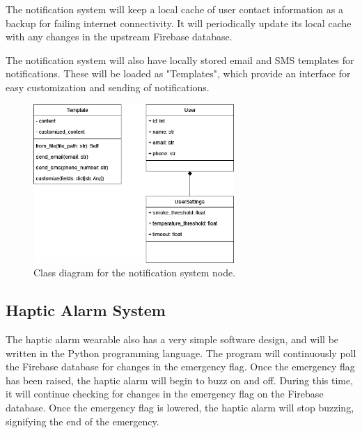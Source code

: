 The notification system will keep a local cache of user contact information as a backup for failing internet
connectivity. It will periodically update its local cache with any changes in the upstream Firebase database.

The notification system will also have locally stored email and SMS templates for notifications. These will be loaded
as "Templates", which provide an interface for easy customization and sending of notifications.

\begin{figure}[H]
    \centering
    \includegraphics[width=3in]{../assets/class/NotificationSystemClassDiagram.png}
    \caption{Class diagram for the notification system node.}
\end{figure}

\subsection{Haptic Alarm System}

The haptic alarm wearable also has a very simple software design, and will be written in the Python programming
language. The program will continuously poll the Firebase database for changes in the emergency flag. Once the
emergency flag has been raised, the haptic alarm will begin to buzz on and off. During this time, it will continue
checking for changes in the emergency flag on the Firebase database. Once the emergency flag is lowered, the haptic
alarm will stop buzzing, signifying the end of the emergency.

